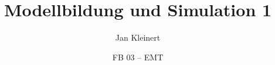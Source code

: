 \title{Modellbildung und Simulation 1}
\author{Jan Kleinert}
\date{FB 03 -- EMT}

 




\makeatletter 
\newcommand{\qr}[2]{%
\href{#2}{%
\begin{tikzpicture} 
\node [rectangle,draw=HBRSblue,rounded corners=5pt, line width=2pt, fill=HBRSlightgray]{%
\qrcode{#2}%
\begin{tabular}{l} \textcolor{HBRSblue}{#1}\\\\
\footnotesize{\texttt{\textcolor{HBRSblue}{#2}}} 
\end{tabular} 
}; 
\end{tikzpicture} 
} 
} 
\makeatother
